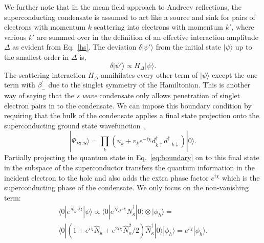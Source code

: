 \documentclass[12pt,letterpaper,aps,onecolumn,superscriptaddress,floatfix,notitlepage]{revtex4-1}
\begin{document}
	We further note that in the mean field approach to Andreev reflections, the superconducting condensate is assumed to act like a source and sink for pairs of electrons with momentum $k$ scattering into electrons with momentum $k'$, where various $k'$ are summed over in the definition of an effective interaction amplitude $\Delta$ as evident from Eq.~\eqref{hs}. The deviation $\delta|\psi'\rangle$ from the initial state $|\psi\rangle$ up to the smallest order in $\Delta$ is,  
	\begin{equation}
	\delta|\psi'\rangle \propto H_{\Delta}|\psi\rangle.
	\end{equation}
	The scattering interaction $H_{\Delta}$ annihilates every other term of $|\psi\rangle$ except the one term with $\beta^{'}_{-}$ due to the singlet symmetry of the Hamiltonian. This is another way of saying that the \textit{s wave} condensate only allows penetration of singlet electron pairs in to the condensate. 
	We can impose this boundary condition by requiring that the bulk of the condensate applies a final state projection onto the superconducting ground state wavefunction~\cite{BCS}, 	\begin{equation}\label{bcsstate}|\Psi_{BCS}\rangle = \prod_{k}(u_{k}+v_{k}e^{-i\chi} d_{k\uparrow}^{\dagger}d_{-k\downarrow}^{\dagger})|0\rangle.\end{equation}
	Partially projecting the quantum state in Eq.~\eqref{eq:boundary} on to this final state in the subspace of the superconductor transfers the quantum information in the incident electron to the hole and also adds the extra phase factor $e^{i\chi}$ which is the superconducting phase of the condensate. We only focus on the non-vanishing term:
	\begin{multline}\langle0|e^{\hat{N}_{\kappa}e^{i\chi}}|\psi\rangle \propto \langle0|e^{\hat{N}_{\kappa}e^{i\chi}}\hat{N}_{\kappa}^{\dagger}|0\rangle\otimes|\phi_{h}\rangle = \\
	\langle 0|(1+ e^{i\chi}\hat{N}_{\kappa}+e^{2i\chi}\hat{N}_{\kappa}^{2}/2)\hat{N}_{\kappa}^{\dagger}|0\rangle|\phi_{h}\rangle = e^{i\chi}|\phi_{h}\rangle.\end{multline}
\end{document}
